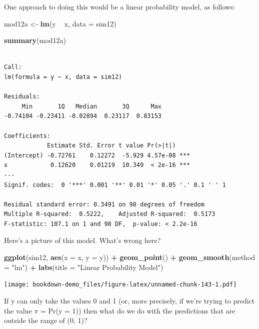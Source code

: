 \documentclass[]{book}
\newenvironment{Shaded}{\begin{snugshade}}{\end{snugshade}}
\newcommand{\KeywordTok}[1]{\textcolor[rgb]{0.13,0.29,0.53}{\textbf{#1}}}
\newcommand{\DataTypeTok}[1]{\textcolor[rgb]{0.13,0.29,0.53}{#1}}
\newcommand{\StringTok}[1]{\textcolor[rgb]{0.31,0.60,0.02}{#1}}
\newcommand{\OperatorTok}[1]{\textcolor[rgb]{0.81,0.36,0.00}{\textbf{#1}}}
\newcommand{\NormalTok}[1]{#1}
\theoremstyle{definition}
\theoremstyle{definition}
\theoremstyle{definition}
\theoremstyle{remark}
\begin{document}
One approach to doing this would be a linear probability model, as
follows:

\begin{Shaded}
\begin{Highlighting}[]
\NormalTok{mod12a <-}\StringTok{ }\KeywordTok{lm}\NormalTok{(y }\OperatorTok{~}\StringTok{ }\NormalTok{x, }\DataTypeTok{data =}\NormalTok{ sim12) }

\KeywordTok{summary}\NormalTok{(mod12a)}
\end{Highlighting}
\end{Shaded}

\begin{verbatim}

Call:
lm(formula = y ~ x, data = sim12)

Residuals:
     Min       1Q   Median       3Q      Max 
-0.74104 -0.23411 -0.02894  0.23117  0.83153 

Coefficients:
            Estimate Std. Error t value Pr(>|t|)    
(Intercept) -0.72761    0.12272  -5.929 4.57e-08 ***
x            0.12620    0.01219  10.349  < 2e-16 ***
---
Signif. codes:  0 '***' 0.001 '**' 0.01 '*' 0.05 '.' 0.1 ' ' 1

Residual standard error: 0.3491 on 98 degrees of freedom
Multiple R-squared:  0.5222,    Adjusted R-squared:  0.5173 
F-statistic: 107.1 on 1 and 98 DF,  p-value: < 2.2e-16
\end{verbatim}

Here's a picture of this model. What's wrong here?

\begin{Shaded}
\begin{Highlighting}[]
\KeywordTok{ggplot}\NormalTok{(sim12, }\KeywordTok{aes}\NormalTok{(}\DataTypeTok{x =}\NormalTok{ x, }\DataTypeTok{y =}\NormalTok{ y)) }\OperatorTok{+}\StringTok{ }
\StringTok{    }\KeywordTok{geom_point}\NormalTok{() }\OperatorTok{+}
\StringTok{    }\KeywordTok{geom_smooth}\NormalTok{(}\DataTypeTok{method =} \StringTok{"lm"}\NormalTok{) }\OperatorTok{+}\StringTok{ }
\StringTok{    }\KeywordTok{labs}\NormalTok{(}\DataTypeTok{title =} \StringTok{"Linear Probability Model"}\NormalTok{)}
\end{Highlighting}
\end{Shaded}

\texttt{[image: bookdown-demo\_files/figure-latex/unnamed-chunk-143-1.pdf]}

If y can only take the values 0 and 1 (or, more precisely, if we're
trying to predict the value \(\pi\) = Pr(y = 1)) then what do we do with
the predictions that are outside the range of (0, 1)?
\end{document}
